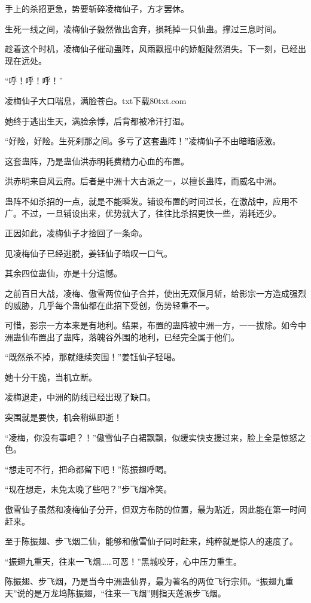 \begin{this_body}
手上的杀招更急，势要斩碎凌梅仙子，方才罢休。

生死一线之间，凌梅仙子毅然做出舍弃，损耗掉一只仙蛊。撑过三息时间。

趁着这个时机，凌梅仙子催动蛊阵，风雨飘摇中的娇躯陡然消失。下一刻，已经出现在远处。

“呼！呼！呼！”

凌梅仙子大口喘息，满脸苍白。txt下载80txt.com

她终于逃出生天，满脸余悸，后背都被冷汗打湿。

“好险，好险。生死刹那之间。多亏了这套蛊阵！”凌梅仙子不由暗暗感激。

这套蛊阵，乃是蛊仙洪赤明耗费精力心血的布置。

洪赤明来自风云府。后者是中洲十大古派之一，以擅长蛊阵，而威名中洲。

蛊阵不如杀招的一点，就是不能瞬发。铺设布置的时间过长，在激战中，应用不广。不过，一旦铺设出来，优势就大了，往往比杀招更快一些，消耗还少。

正因如此，凌梅仙子才捡回了一条命。

见凌梅仙子已经逃脱，姜钰仙子暗叹一口气。

其余四位蛊仙，亦是十分遗憾。

之前百日大战，凌梅、傲雪两位仙子合并，使出无双偃月斩，给影宗一方造成强烈的威胁，几乎每个蛊仙都在此招下受创，伤势轻重不一。

可惜，影宗一方本来是有地利。结果，布置的蛊阵被中洲一方，一一拔除。如今中洲蛊仙布置出了蛊阵，落魄谷外围的地利，已经完全属于他们。

“既然杀不掉，那就继续突围！”姜钰仙子轻喝。

她十分干脆，当机立断。

凌梅退走，中洲的防线已经出现了缺口。

突围就是要快，机会稍纵即逝！

“凌梅，你没有事吧？！”傲雪仙子白裙飘飘，似缓实快支援过来，脸上全是惊怒之色。

“想走可不行，把命都留下吧！”陈振翅呼喝。

“现在想走，未免太晚了些吧？”步飞烟冷笑。

傲雪仙子虽然和凌梅仙子分开，但双方布防的位置，最为贴近，因此能在第一时间赶来。

至于陈振翅、步飞烟二仙，能够和傲雪仙子同时赶来，纯粹就是惊人的速度了。

“振翅九重天，往来一飞烟……可恶！”黑城咬牙，心中压力重生。

陈振翅、步飞烟，乃是当今中洲蛊仙界，最为著名的两位飞行宗师。“振翅九重天”说的是万龙坞陈振翅，“往来一飞烟”则指天莲派步飞烟。


\end{this_body}
